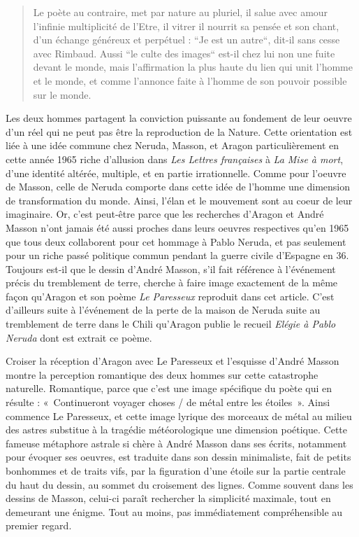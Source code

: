 \begin{quote}
Le poète au contraire, met par nature au pluriel, il salue avec amour l’infinie multiplicité de l’Etre, il vitrer il nourrit sa pensée et son chant, d’un échange généreux et perpétuel : “Je est un autre“, dit-il sans cesse avec Rimbaud. Aussi “le culte des images“ est-il chez lui non une fuite devant le monde, mais l’affirmation la plus haute du lien qui unit l’homme et le monde, et comme l’annonce faite à l’homme de son pouvoir possible sur le monde. 
\end{quote}	


	Les deux hommes partagent la conviction puissante au fondement de leur oeuvre d’un réel qui ne peut pas être la reproduction de la Nature. Cette orientation est liée à une idée commune chez Neruda, Masson, et Aragon particulièrement en cette année 1965 riche d’allusion dans \emph{Les Lettres françaises} à \emph{La Mise à mort}, d’une identité altérée, multiple, et en partie irrationnelle. Comme pour l’oeuvre de Masson, celle de Neruda comporte dans cette idée de l’homme une dimension de transformation du monde. Ainsi, l’élan et le mouvement sont au coeur de leur imaginaire. Or, c’est peut-être parce que les recherches d’Aragon et André Masson n’ont jamais été aussi proches dans leurs oeuvres respectives qu’en 1965 que tous deux collaborent pour cet hommage à Pablo Neruda, et pas seulement pour un riche passé politique commun pendant la guerre civile d’Espagne en 36.  Toujours est-il que le dessin d’André Masson, s’il fait référence à l’événement précis du tremblement de terre, cherche à faire image exactement de la même façon qu’Aragon et son poème \emph{Le Paresseux} reproduit dans cet article. C’est d’ailleurs suite à l’événement de la perte de la maison de Neruda suite au tremblement de terre dans le Chili qu’Aragon publie le recueil \emph{Elégie à Pablo Neruda} dont est extrait ce poème. 



Croiser la réception d’Aragon avec Le Paresseux et l’esquisse d’André Masson montre la perception romantique des deux hommes sur cette catastrophe naturelle. Romantique, parce que c’est une image spécifique du poète qui en résulte : « Continueront voyager choses / de métal entre les étoiles ». Ainsi commence Le Paresseux, et cette image lyrique des morceaux de métal au milieu des astres substitue à la tragédie météorologique une dimension poétique. Cette fameuse métaphore astrale si chère à André Masson dans ses écrits, notamment pour évoquer ses oeuvres, est traduite dans son dessin minimaliste, fait de petits bonhommes et de traits vifs, par la figuration d’une étoile sur la partie centrale du haut du dessin, au sommet du croisement des lignes. Comme souvent dans les dessins de Masson, celui-ci paraît rechercher la simplicité maximale, tout en demeurant une énigme. Tout au moins, pas immédiatement compréhensible au premier regard. 

